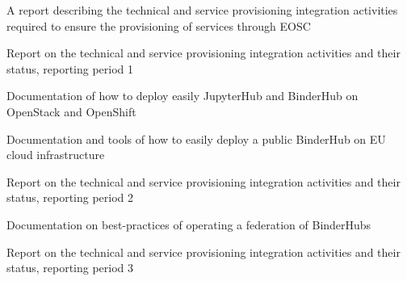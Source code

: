 \begin{workpackage}
\begin{wpdescription}
\end{wpdescription}

\begin{tasklist}
% 



\end{tasklist}

\begin{wpdelivs}
    \begin{wpdeliv}[due=6,miles=community,id=eosc-annual-report,dissem=PU,nature=R,lead=EGI]
    {A report describing the technical and service provisioning integration activities required to ensure the provisioning of \TheProject services through EOSC}
  \end{wpdeliv}
    \begin{wpdeliv}[due=18,miles=prototype,id=eosc-annual-report-1,dissem=PU,nature=R,lead=EGI]
    {Report on the technical and service provisioning integration activities and their status, reporting period 1}
  \end{wpdeliv}
  \begin{wpdeliv}[due=18,miles=startup,id=openstack-openshift-documentation,dissem=PU,nature=R,lead=EP]
    {Documentation of how to deploy easily JupyterHub and BinderHub on OpenStack and OpenShift}
  \end{wpdeliv}
  \begin{wpdeliv}[due=24,miles=prototype,id=eu-binder-instance,dissem=PU,nature=R,lead=SRL]
    {Documentation and tools of how to easily deploy a public BinderHub on EU
    cloud infrastructure}
  \end{wpdeliv}
  \begin{wpdeliv}[due=36,miles=community,id=eosc-annual-report-2,dissem=PU,nature=R,lead=EGI]
    {Report on the technical and service provisioning integration activities and their status, reporting period 2}
  \end{wpdeliv}
  \begin{wpdeliv}[due=48,miles=final,id=binder-federation,dissem=PU,nature=R,lead=SRL]
    {Documentation on best-practices of operating a federation of BinderHubs}
  \end{wpdeliv}
  \begin{wpdeliv}[due=48,miles=final,id=eosc-annual-report-3,dissem=PU,nature=R,lead=EGI]
    {Report on the technical and service provisioning integration activities and their status, reporting period 3}
  \end{wpdeliv}
\end{wpdelivs}
\end{workpackage}

